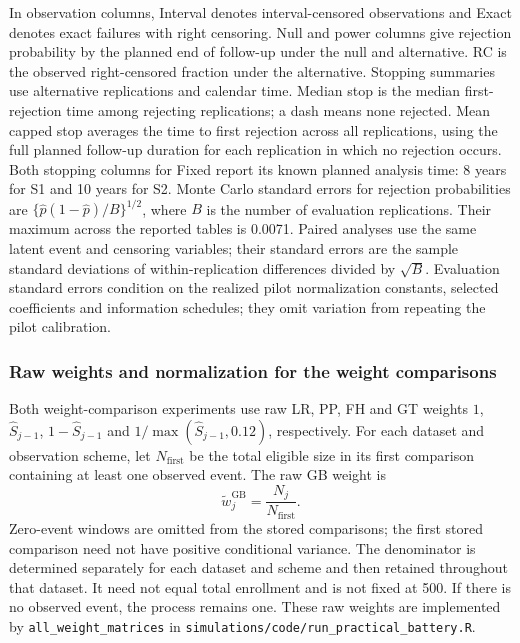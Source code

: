 \documentclass[12pt]{article}
\theoremstyle{definition}
\theoremstyle{remark}
\begin{document}
In observation columns, Interval denotes interval-censored observations and Exact denotes exact failures with right censoring. Null and power columns give rejection probability by the planned end of follow-up under the null and alternative. RC is the observed right-censored fraction under the alternative. Stopping summaries use alternative replications and calendar time. Median stop is the median first-rejection time among rejecting replications; a dash means none rejected. Mean capped stop averages the time to first rejection across all replications, using the full planned follow-up duration for each replication in which no rejection occurs. Both stopping columns for Fixed report its known planned analysis time: 8 years for S1 and 10 years for S2.
Monte Carlo standard errors for rejection probabilities are $\{\widehat p(1-\widehat p)/B\}^{1/2}$, where $B$ is the number of evaluation replications. Their maximum across the reported tables is 0.0071. Paired analyses use the same latent event and censoring variables; their standard errors are the sample standard deviations of within-replication differences divided by $\sqrt{B}$. Evaluation standard errors condition on the realized pilot normalization constants, selected coefficients and information schedules; they omit variation from repeating the pilot calibration.


\subsubsection{Raw weights and normalization for the weight comparisons}
\label{sec:app-weight-normalization}
Both weight-comparison experiments use raw LR, PP, FH and GT weights $1$, $\widehat S_{j-1}$, $1-\widehat S_{j-1}$ and $1/\max(\widehat S_{j-1},0.12)$, respectively. For each dataset and observation scheme, let $N_{\mathrm{first}}$ be the total eligible size in its first comparison containing at least one observed event. The raw GB weight is
\[
 \widetilde w_j^{\mathrm{GB}}=\frac{N_j}{N_{\mathrm{first}}}.
\]
Zero-event windows are omitted from the stored comparisons; the first stored comparison need not have positive conditional variance. The denominator is determined separately for each dataset and scheme and then retained throughout that dataset. It need not equal total enrollment and is not fixed at 500. If there is no observed event, the process remains one. These raw weights are implemented by \texttt{all\_weight\_matrices} in \nolinkurl{simulations/code/run_practical_battery.R}.
\end{document}
